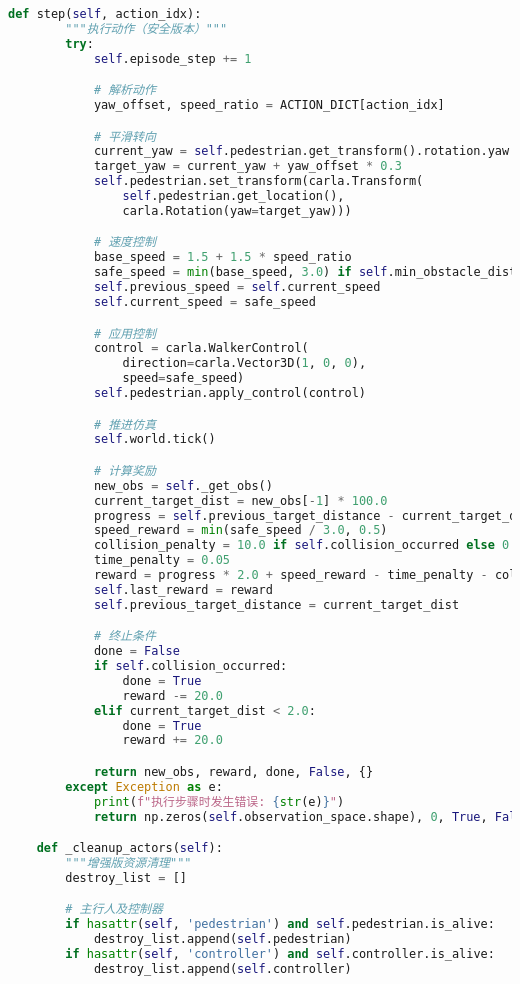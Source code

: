 \begin{lstlisting}[language=Python]
    def step(self, action_idx):
        """执行动作（安全版本）"""
        try:
            self.episode_step += 1

            # 解析动作
            yaw_offset, speed_ratio = ACTION_DICT[action_idx]

            # 平滑转向
            current_yaw = self.pedestrian.get_transform().rotation.yaw
            target_yaw = current_yaw + yaw_offset * 0.3
            self.pedestrian.set_transform(carla.Transform(
                self.pedestrian.get_location(),
                carla.Rotation(yaw=target_yaw)))

            # 速度控制
            base_speed = 1.5 + 1.5 * speed_ratio
            safe_speed = min(base_speed, 3.0) if self.min_obstacle_distance > 2.0 else 0.8
            self.previous_speed = self.current_speed
            self.current_speed = safe_speed

            # 应用控制
            control = carla.WalkerControl(
                direction=carla.Vector3D(1, 0, 0),
                speed=safe_speed)
            self.pedestrian.apply_control(control)

            # 推进仿真
            self.world.tick()

            # 计算奖励
            new_obs = self._get_obs()
            current_target_dist = new_obs[-1] * 100.0
            progress = self.previous_target_distance - current_target_dist
            speed_reward = min(safe_speed / 3.0, 0.5)
            collision_penalty = 10.0 if self.collision_occurred else 0.0
            time_penalty = 0.05
            reward = progress * 2.0 + speed_reward - time_penalty - collision_penalty
            self.last_reward = reward
            self.previous_target_distance = current_target_dist

            # 终止条件
            done = False
            if self.collision_occurred:
                done = True
                reward -= 20.0
            elif current_target_dist < 2.0:
                done = True
                reward += 20.0

            return new_obs, reward, done, False, {}
        except Exception as e:
            print(f"执行步骤时发生错误: {str(e)}")
            return np.zeros(self.observation_space.shape), 0, True, False, {}

    def _cleanup_actors(self):
        """增强版资源清理"""
        destroy_list = []

        # 主行人及控制器
        if hasattr(self, 'pedestrian') and self.pedestrian.is_alive:
            destroy_list.append(self.pedestrian)
        if hasattr(self, 'controller') and self.controller.is_alive:
            destroy_list.append(self.controller)


\end{lstlisting}
